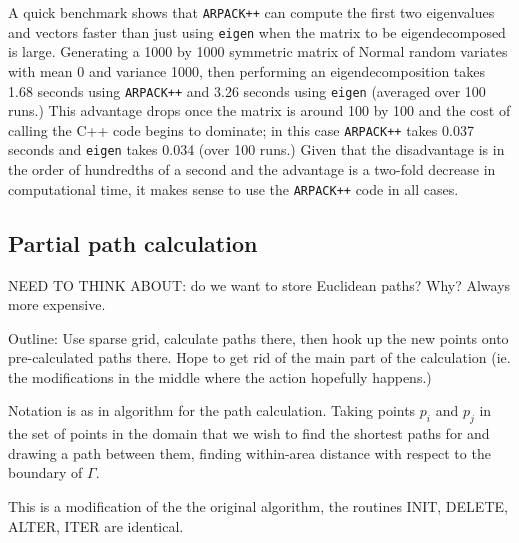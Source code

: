 \documentclass[a4paper,10pt]{article}
\begin{document}
A quick benchmark shows that \texttt{ARPACK++} can compute the first two eigenvalues and vectors faster than just using \texttt{eigen} when the matrix to be eigendecomposed is large. Generating a 1000 by 1000 symmetric matrix of Normal random variates with mean 0 and variance 1000, then performing an eigendecomposition takes 1.68 seconds using \texttt{ARPACK++} and 3.26 seconds using \texttt{eigen} (averaged over 100 runs.) This advantage drops once the matrix is around 100 by 100 and the cost of calling the C++ code begins to dominate; in this case \texttt{ARPACK++} takes 0.037 seconds and \texttt{eigen} takes 0.034 (over 100 runs.) Given that the disadvantage is in the order of hundredths of a second and the advantage is a two-fold decrease in computational time, it makes sense to use the \texttt{ARPACK++} code in all cases.



\subsection{Partial path calculation}

NEED TO THINK ABOUT: do we want to store Euclidean paths? Why? Always more expensive.

Outline: Use sparse grid, calculate paths there, then hook up the new points onto pre-calculated paths there. Hope to get rid of the main part of the calculation (ie. the modifications in the middle where the action hopefully happens.)

Notation is as in algorithm for the path calculation. Taking points $p_i$ and $p_j$ in the set of points in the domain that we wish to find the shortest paths for and drawing a path between them, finding within-area distance with respect to the boundary of $\Gamma$.

This is a modification of the the original algorithm, the routines INIT, DELETE, ALTER, ITER are identical.
\end{document}
